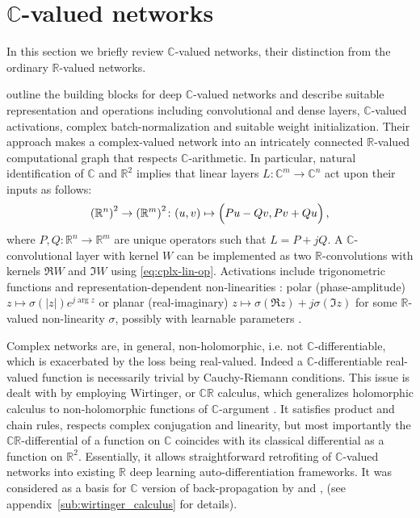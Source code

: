 \documentclass[a4paper,10pt]{article}
\newcommand{\real}{\mathbb{R}}
\newcommand{\cplx}{\mathbb{C}}
\newcommand{\important}[1]{\textbf{\!\colorbox{red}{#1}\!}}
\newcommand{\todo}[1]{{\color{blue} [TODO]} \important{#1}}
\begin{document}



\section{$\cplx$-valued networks} %
\label{sec:c_valued_networks}

In this section we briefly review $\cplx$-valued networks, their distinction from the
ordinary $\real$-valued networks.

\citet{trabelsi_deep_2017} outline the building blocks for deep $\cplx$-valued networks
and describe suitable representation and operations including convolutional and dense layers,
$\cplx$-valued activations, complex batch-normalization and suitable weight initialization.
Their approach makes a complex-valued network into an intricately connected $\real$-valued
computational graph that respects $\cplx$-arithmetic.
%
In particular, natural identification of $\cplx$ and $\real^2$ implies that linear layers $
  L \colon \cplx^m \to \cplx^n
$ act upon their inputs as follows:
\begin{equation}  \label{eq:cplx-lin-op}
  {(\real^n)}^{2}
    \to {(\real^m)}^{2}
    \colon (u, v)
      \mapsto \Bigl(
        P u - Q v,
        P v + Q u
      \Bigr)
    \,,
\end{equation}
where $
  P, Q \colon \real^{n} \to \real^{m}
$ are unique operators such that $L = P + j Q$. A $\cplx$-convolutional layer with kernel
$W$ can be implemented as two $\real$-convolutions with kernels $\Re{W}$ and $\Im{W}$ using
\eqref{eq:cplx-lin-op}. Activations include trigonometric functions and representation-dependent
non-linearities \citep{hirose_complex-valued_2009}: polar (phase-amplitude) $
  z \mapsto \sigma(\lvert z \rvert) e^{j \arg z}
$ or planar (real-imaginary) $
  z \mapsto \sigma(\Re z) + j \sigma(\Im z)
$ for some $\real$-valued non-linearity $\sigma$, possibly with learnable parameters
\citep{trabelsi_deep_2017,wolter_complex_2018}.

Complex networks are, in general, non-holomorphic, i.e. not $\cplx$-differentiable, which is
exacerbated by the loss being real-valued. Indeed a $\cplx$-differentiable real-valued function is
necessarily trivial by Cauchy-Riemann conditions. This issue is dealt with by employing Wirtinger,
or $\cplx\real$ calculus, which generalizes holomorphic calculus to non-holomorphic functions
of $\cplx$-argument \citep{adali_complex-valued_2011,boeddeker_computation_2019}. It satisfies
product and chain rules, respects complex conjugation and linearity, but most importantly the
$\cplx\real$-differential of a function on $\cplx$ coincides with its classical differential as
a function on $\real^2$. Essentially, it allows straightforward retrofiting of $\cplx$-valued
networks into existing $\real$ deep learning auto-differentiation frameworks. It was considered
as a basis for $\cplx$ version of back-propagation by \citet{benvenuto_complex_1992} and
\citet{trabelsi_deep_2017}, (see appendix~\ref{sub:wirtinger_calculus} for details).
\end{document}
